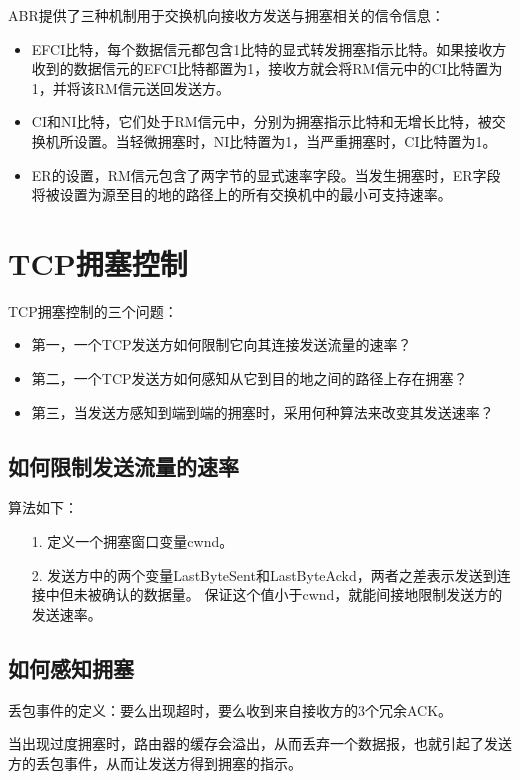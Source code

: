 \documentclass[a4paper,left=2.5cm,right=2.5cm,11pt]{article}
\begin{document}
	ABR提供了三种机制用于交换机向接收方发送与拥塞相关的信令信息：
	\begin{itemize}
		\item EFCI比特，每个数据信元都包含1比特的显式转发拥塞指示比特。如果接收方收到的数据信元的EFCI比特都置为1，接收方就会将RM信元中的CI比特置为1，并将该RM信元送回发送方。
		\item CI和NI比特，它们处于RM信元中，分别为拥塞指示比特和无增长比特，被交换机所设置。当轻微拥塞时，NI比特置为1，当严重拥塞时，CI比特置为1。
		\item ER的设置，RM信元包含了两字节的显式速率字段。当发生拥塞时，ER字段将被设置为源至目的地的路径上的所有交换机中的最小可支持速率。
	\end{itemize}

\section{TCP拥塞控制}
	TCP拥塞控制的三个问题：
	\begin{itemize}
		\item 第一，一个TCP发送方如何限制它向其连接发送流量的速率？
		\item 第二，一个TCP发送方如何感知从它到目的地之间的路径上存在拥塞？
		\item 第三，当发送方感知到端到端的拥塞时，采用何种算法来改变其发送速率？
	\end{itemize}

\subsection{如何限制发送流量的速率}
	算法如下：
	\begin{itemize}
		\item[1.] 定义一个拥塞窗口变量cwnd。
		\item[2.] 发送方中的两个变量LastByteSent和LastByteAckd，两者之差表示发送到连接中但未被确认的数据量。
			      保证这个值小于cwnd，就能间接地限制发送方的发送速率。
	\end{itemize}

\subsection{如何感知拥塞}
	丢包事件的定义：要么出现超时，要么收到来自接收方的3个冗余ACK。\par

	当出现过度拥塞时，路由器的缓存会溢出，从而丢弃一个数据报，也就引起了发送方的丢包事件，从而让发送方得到拥塞的指示。
\end{document}
